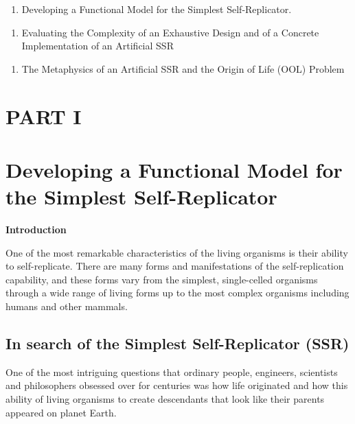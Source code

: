 \documentclass[letterpaper]{article}
\begin{document}
\begin{enumerate}
\item Developing a Functional Model for the Simplest Self-Replicator.
\end{enumerate}

\bigskip

\begin{enumerate}
\item Evaluating the Complexity of an Exhaustive Design and of a
Concrete Implementation of an Artificial SSR
\end{enumerate}

\bigskip

\begin{enumerate}
\item The Metaphysics of an Artificial SSR and the Origin of Life (OOL)
Problem
\end{enumerate}

\bigskip

\clearpage\section[PART I]{PART I}
\hypertarget{RefHeading3032306210128}{}\section[Developing a Functional
Model for the Simplest Self{}-Replicator]{Developing a Functional Model
for the Simplest Self-Replicator}
\hypertarget{RefHeading3034306210128}{}
\bigskip

{\bfseries
\hypertarget{RefHeading3036306210128}{}Introduction}


\bigskip

One of the most remarkable characteristics of the living organisms is
their ability to self-replicate. There are many forms and
manifestations of the self-replication capability, and these forms vary
from the simplest, single-celled organisms through a wide range of
living forms up to the most complex organisms including humans and
other mammals.


\bigskip

\subsection[In search of the Simplest Self{}-Replicator (SSR)]{In search
of the Simplest Self-Replicator (SSR)}
\hypertarget{RefHeading3038306210128}{}
\bigskip

One of the most intriguing questions that ordinary people, engineers,
scientists and philosophers obsessed over for centuries was how life
originated and how this ability of living organisms to create
descendants that look like their parents appeared on planet Earth. 
\end{document}
